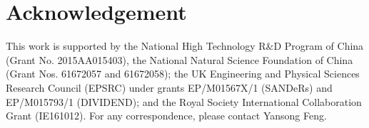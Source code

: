 \section*{Acknowledgement}
\vspace{-1mm} This work is supported by the National High Technology R\&D Program of China (Grant No. 2015AA015403), the National
Natural Science Foundation of China (Grant Nos. 61672057 and 61672058); the UK Engineering and Physical Sciences Research Council (EPSRC)
under grants EP/M01567X/1 (SANDeRs) and EP/M015793/1 (DIVIDEND); and the Royal Society International Collaboration Grant (IE161012). For
any correspondence, please contact Yansong Feng.
